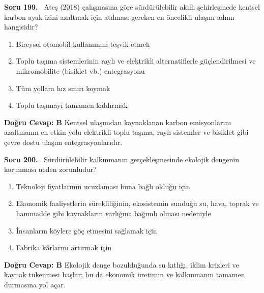 \documentclass[11pt,a4paper,openany]{book}
\begin{document}
\needspace{5cm}
\vspace{8pt}
\noindent\textbf{\large\sffamily Soru 199.} \ Ateş (2018) çalışmasına göre sürdürülebilir akıllı şehirleşmede kentsel karbon ayak izini azaltmak için atılması gereken en öncelikli ulaşım adımı hangisidir?
\begin{enumerate}[label=\Alph*), leftmargin=25pt, topsep=4pt, itemsep=2pt]
    \item Bireysel otomobil kullanımını teşvik etmek
    \item Toplu taşıma sistemlerinin raylı ve elektrikli alternatiflerle güçlendirilmesi ve mikromobilite (bisiklet vb.) entegrasyonu
    \item Tüm yollara hız sınırı koymak
    \item Toplu taşımayı tamamen kaldırmak
\end{enumerate}
\vspace{4pt}
\begin{tcolorbox}[title=Cevap ve Açıklama, colback=gray!3!white, colframe=primarycolor!90!black, arc=2mm, fonttitle=\bfseries\sffamily, top=6pt, bottom=6pt]
    \textbf{Doğru Cevap: B}
    \vspace{2pt}
    Kentsel ulaşımdan kaynaklanan karbon emisyonlarını azaltmanın en etkin yolu elektrikli toplu taşıma, raylı sistemler ve bisiklet gibi çevre dostu ulaşım entegrasyonlarıdır.
\end{tcolorbox}
\vspace{10pt}

\needspace{5cm}
\vspace{8pt}
\noindent\textbf{\large\sffamily Soru 200.} \ Sürdürülebilir kalkınmanın gerçekleşmesinde ekolojik dengenin korunması neden zorunludur?
\begin{enumerate}[label=\Alph*), leftmargin=25pt, topsep=4pt, itemsep=2pt]
    \item Teknoloji fiyatlarının ucuzlaması buna bağlı olduğu için
    \item Ekonomik faaliyetlerin sürekliliğinin, ekosistemin sunduğu su, hava, toprak ve hammadde gibi kaynakların varlığına bağımlı olması nedeniyle
    \item İnsanların köylere göç etmesini sağlamak için
    \item Fabrika kârlarını artırmak için
\end{enumerate}
\vspace{4pt}
\begin{tcolorbox}[title=Cevap ve Açıklama, colback=gray!3!white, colframe=primarycolor!90!black, arc=2mm, fonttitle=\bfseries\sffamily, top=6pt, bottom=6pt]
    \textbf{Doğru Cevap: B}
    \vspace{2pt}
    Ekolojik denge bozulduğunda su kıtlığı, iklim krizleri ve kaynak tükenmesi başlar; bu da ekonomik üretimin ve kalkınmanın tamamen durmasına yol açar.
\end{tcolorbox}
\vspace{10pt}
\end{document}
